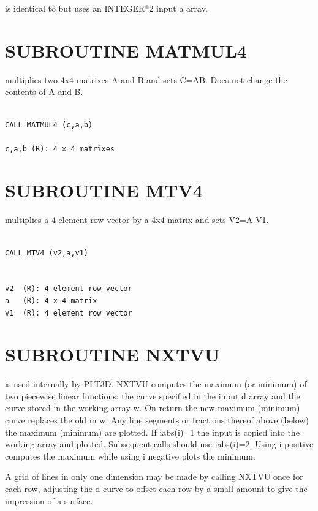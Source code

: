 \documentclass[11pt]{report}
\begin{document}
 is identical to  but uses an INTEGER*2 input
a array.

\section{SUBROUTINE MATMUL4}

 multiplies two 4x4 matrixes A and B and sets C=AB.  Does not
change the contents of A and B.
\begin{verbatim}

CALL MATMUL4 (c,a,b)

c,a,b (R): 4 x 4 matrixes
\end{verbatim}

\section{SUBROUTINE MTV4}

 multiplies a 4 element row vector by a 4x4 matrix and sets V2=A V1.
\begin{verbatim}

CALL MTV4 (v2,a,v1)


v2  (R): 4 element row vector
a   (R): 4 x 4 matrix
v1  (R): 4 element row vector
\end{verbatim}

\section{SUBROUTINE NXTVU}

 is used internally by PLT3D.  NXTVU computes the maximum (or minimum)
of two piecewise linear functions: the curve specified in the input d array
and the curve stored in the working array w.
On return the new maximum (minimum) curve replaces the old in w.  Any line
segments or fractions thereof above (below) the maximum (minimum) are plotted.
If iabs(i)=1 the input is copied into the working array and plotted.
Subsequent calls should use iabs(i)=2.
Using i positive computes the maximum while using i negative plots the
minimum.

A grid of lines in only one dimension may be made by calling NXTVU once
for each row, adjusting the d curve to offset each row by a small
amount to give the impression of a surface.
\end{document}
